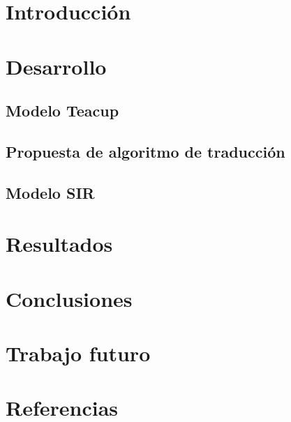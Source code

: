 \documentclass[11pt, a4paper]{article}
\begin{document}

\maketitle
\newpage

\tableofcontents
\newpage

%
\section{Introducción}


\section{Desarrollo}

\subsection{Modelo Teacup}

\subsection{Propuesta de algoritmo de traducción}


\subsection{Modelo SIR}


\section{Resultados}


\section{Conclusiones}


\section{Trabajo futuro}


\section{Referencias}


\clearpage
\addappheadtotoc
\appendix
\appendixpage






\end{document}
